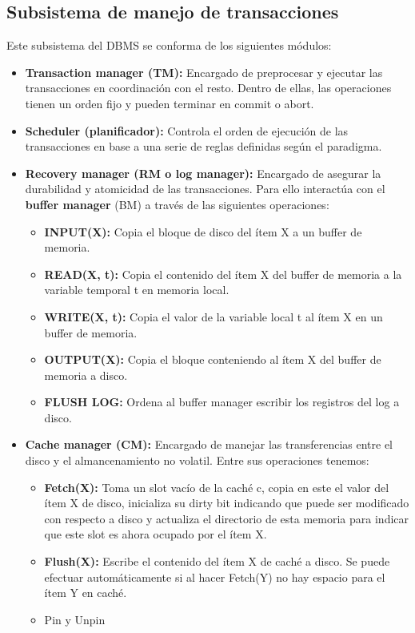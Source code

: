 \subsection*{Subsistema de manejo de transacciones}
Este subsistema del DBMS se conforma de los siguientes módulos:
\begin{itemize}
    \item \textbf{Transaction manager (TM):} Encargado de preprocesar y ejecutar las transacciones en coordinación con el resto. Dentro de ellas, las operaciones tienen un orden fijo y pueden terminar en commit o abort.
    \item \textbf{Scheduler (planificador):} Controla el orden de ejecución de las transacciones en base a una serie de reglas definidas según el paradigma.
    \item \textbf{Recovery manager (RM o log manager):} Encargado de asegurar la durabilidad y atomicidad de las transacciones. Para ello interactúa con el \textbf{buffer manager} (BM) a través de las siguientes operaciones:
    \begin{itemize}
        \item \textbf{INPUT(X):} Copia el bloque de disco del ítem X a un buffer de memoria.
        \item \textbf{READ(X, t):} Copia el contenido del ítem X del buffer de memoria a la variable temporal t en memoria local.
        \item \textbf{WRITE(X, t):} Copia el valor de la variable local t al ítem X en un buffer de memoria.
        \item \textbf{OUTPUT(X):} Copia el bloque conteniendo al ítem X del buffer de memoria a disco.
        \item \textbf{FLUSH LOG:} Ordena al buffer manager escribir los registros del log a disco.
    \end{itemize}
    \item \textbf{Cache manager (CM):} Encargado de manejar las transferencias entre el disco y el almancenamiento no volatil. Entre sus operaciones tenemos:
    \begin{itemize}
    \item \textbf{Fetch(X):} Toma un slot vacío de la caché c, copia en este el valor del ítem X de disco, inicializa su dirty bit indicando que puede ser modificado con respecto a disco y actualiza el directorio de esta memoria para indicar que este slot es ahora ocupado por el ítem X.
    \item \textbf{Flush(X):} Escribe el contenido del ítem X de caché a disco. Se puede efectuar automáticamente si al hacer Fetch(Y) no hay espacio para el ítem Y en caché.
    \item Pin y Unpin
    \end{itemize}
\end{itemize}
